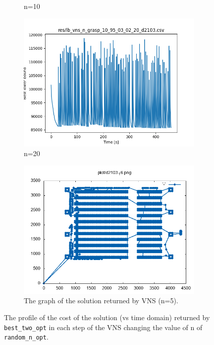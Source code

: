 \begin{figure}[!h]
\begin{subfigure}{.5\columnwidth}
		\caption{n=10}
		\label{fig:lb_vns_n_grasp_10_95_03_02_10_d2103}
	\end{subfigure}
	\begin{subfigure}{.5\columnwidth}
		\centering
		\includegraphics[width=\columnwidth]{../res/lb_vns_n_grasp_10_95_03_02_20_d2103.png}
		\caption{n=20}
		\label{fig:lb_vns_n_grasp_10_95_03_02_20_d2103}
	\end{subfigure}
	\begin{subfigure}{.5\columnwidth}
		\centering
		\includegraphics[width=\columnwidth]{../res/d2103_16.png}
		\caption{The graph of the solution returned by VNS (n=5).}
		\label{fig:d2103_16}
	\end{subfigure}
	\caption{The profile of the cost of the solution (vs time domain) returned by \texttt{best\_two\_opt} in each step of the VNS changing the value of n of \texttt{random\_n\_opt}.}
	\label{fig:lb_vns}
\end{figure}

